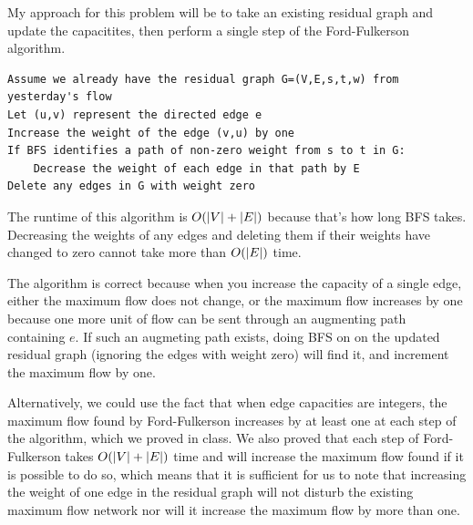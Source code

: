 \documentclass{article}
\begin{document}
\bigskip
\par
\begin{prob}
\end{prob}
My approach for this problem will be to take an existing residual graph and update the capacitites, then perform a single step of the Ford-Fulkerson algorithm.
\begin{lstlisting}[frame=single]
Assume we already have the residual graph G=(V,E,s,t,w) from yesterday's flow
Let (u,v) represent the directed edge e
Increase the weight of the edge (v,u) by one
If BFS identifies a path of non-zero weight from s to t in G:
    Decrease the weight of each edge in that path by E
Delete any edges in G with weight zero
\end{lstlisting}
The runtime of this algorithm is $O(\left\lvert V \right\rvert + \left\lvert E \right\rvert)$ because that's how long BFS takes. Decreasing the weights of any edges and deleting them if their weights have changed to zero cannot take more than $O(\left\lvert E \right\rvert)$ time.
\par
The algorithm is correct because when you increase the capacity of a single edge, either the maximum flow does not change, or the maximum flow increases by one because one more unit of flow can be sent through an augmenting path containing $e$. If such an augmeting path exists, doing BFS on on the updated residual graph (ignoring the edges with weight zero) will find it, and increment the maximum flow by one.
\par
Alternatively, we could use the fact that when edge capacities are integers, the maximum flow found by Ford-Fulkerson increases by at least one at each step of the algorithm, which we proved in class. We also proved that each step of Ford-Fulkerson takes $O(\left\lvert V \right\rvert+\left\lvert E \right\rvert)$ time and will increase the maximum flow found if it is possible to do so, which means that it is sufficient for us to note that increasing the weight of one edge in the residual graph will not disturb the existing maximum flow network nor will it increase the maximum flow by more than one.


\end{document}
